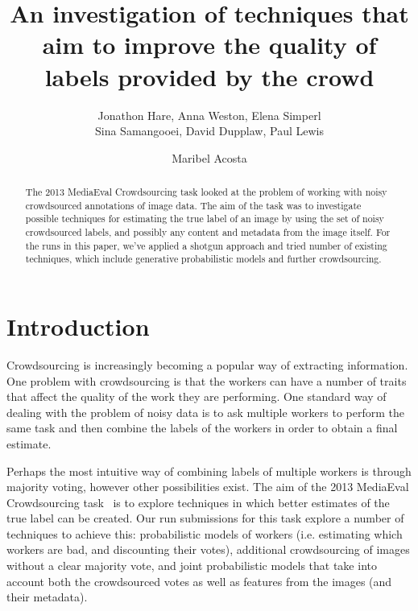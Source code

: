 \documentclass{../acm_proc_article-me11_tweaked}
\begin{document}

\title{An investigation of techniques that aim to improve the quality of labels provided by the crowd}

%
\def\sharedaffiliation{%
\end{tabular}
\begin{tabular}{c}}
%

\author{
	\alignauthor
	Jonathon Hare, Anna Weston, Elena Simperl\\
	Sina Samangooei, David Dupplaw, Paul Lewis\\
	\and
	\alignauthor
	Maribel Acosta\\
}

\maketitle
\begin{abstract}
The 2013 MediaEval Crowdsourcing task looked at the problem of working with noisy crowdsourced annotations of image data. The aim of the task was to investigate possible techniques for estimating the true label of an image by using the set of noisy crowdsourced labels, and possibly any content and metadata from the image itself. For the runs in this paper, we've applied a shotgun approach and tried number of existing techniques, which include generative probabilistic models and further crowdsourcing.
\end{abstract}

\section{Introduction}
Crowdsourcing is increasingly becoming a popular way of extracting information. One problem with crowdsourcing is that the workers can have a number of traits that affect the quality of the work they are performing. One standard way of dealing with the problem of noisy data is to ask multiple workers to perform the same task and then combine the labels of the workers in order to obtain a final estimate.

Perhaps the most intuitive way of combining labels of multiple workers is through majority voting, however other possibilities exist. The aim of the 2013 MediaEval Crowdsourcing task~\cite{CS2013} is to explore techniques in which better estimates of the true label can be created. Our run submissions for this task explore a number of techniques to achieve this: probabilistic models of workers (i.e. estimating which workers are bad, and discounting their votes), additional crowdsourcing of images without a clear majority vote, and joint probabilistic models that take into account both the crowdsourced votes as well as features from the images (and their metadata).
	
\end{document}

